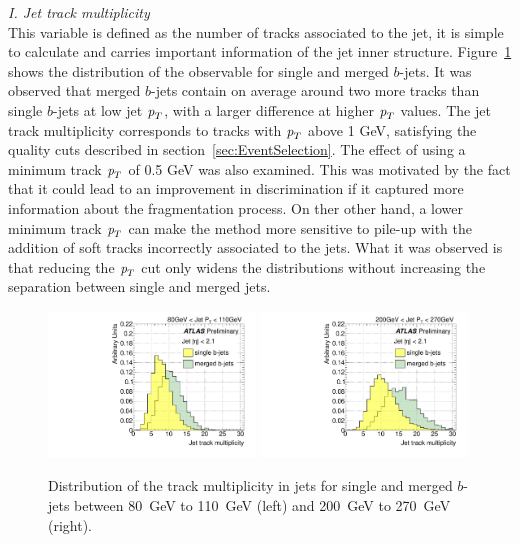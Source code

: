 { \em I. Jet track multiplicity}
\\[3mm]
This variable is defined as the number of tracks associated to the jet, it is simple to calculate and carries important information of the jet inner structure. Figure~\ref{fig:ntrksinglemerged} shows the distribution of the observable for single and merged $b$-jets.  It was observed that merged $b$-jets contain on average around two more tracks than single $b$-jets at low jet ${\emph{p}_{T}}$, with a larger difference at higher ${\emph{p}_{T}}$ values. The jet track multiplicity corresponds to tracks with ${\emph{p}_{T}}$ above 1 GeV, satisfying the quality cuts described in section~\ref{sec:EventSelection}. The effect of using a minimum track ${\emph{p}_{T}}$ of 0.5 GeV was also examined. This was motivated by the fact that it could lead to an improvement in discrimination if it captured more information about the fragmentation process.  On ther other hand, a lower minimum track ${\emph{p}_{T}}$ can make the method more sensitive to pile-up with the addition of soft tracks incorrectly associated to the jets.  What it was observed is that reducing the ${\emph{p}_{T}}$ cut only widens the distributions without increasing the separation between single and merged jets. 
\begin{figure}[tp]
\centering
\includegraphics[width=0.49\textwidth]{FIGS/VarsSingleMerged/Ntrk080.pdf}
\includegraphics[width=0.49\textwidth]{FIGS/VarsSingleMerged/Ntrk200.pdf}
\caption{Distribution of the track multiplicity in jets for single and merged $b$-jets between 80~GeV to 110~GeV (left) and 200~GeV to 270~GeV (right).}
\label{fig:ntrksinglemerged}
\end{figure}

